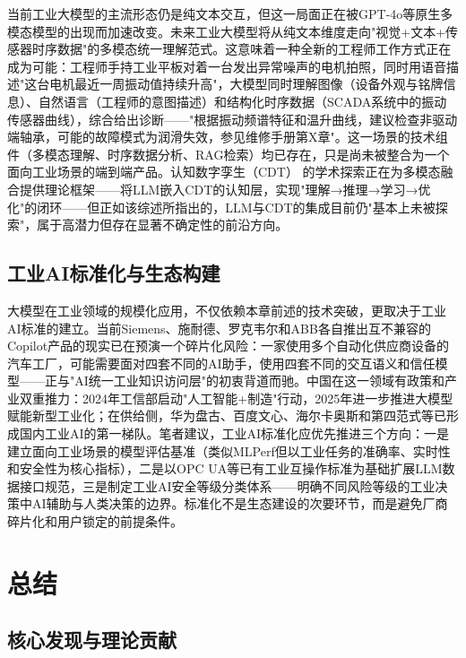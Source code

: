 \documentclass[12pt,a4paper]{ctexart}
\begin{document}
当前工业大模型的主流形态仍是纯文本交互，但这一局面正在被GPT-4o等原生多模态模型的出现而加速改变。\cite{ieee2024llmindustrial}未来工业大模型将从纯文本维度走向"视觉+文本+传感器时序数据"的多模态统一理解范式。这意味着一种全新的工程师工作方式正在成为可能：工程师手持工业平板对着一台发出异常噪声的电机拍照，同时用语音描述"这台电机最近一周振动值持续升高"，大模型同时理解图像（设备外观与铭牌信息）、自然语言（工程师的意图描述）和结构化时序数据（SCADA系统中的振动传感器曲线），综合给出诊断——"根据振动频谱特征和温升曲线，建议检查非驱动端轴承，可能的故障模式为润滑失效，参见维修手册第X章"。这一场景的技术组件（多模态理解、时序数据分析、RAG检索）均已存在，只是尚未被整合为一个面向工业场景的端到端产品。认知数字孪生（CDT）\cite{jiic2025cdtllm} 的学术探索正在为多模态融合提供理论框架——将LLM嵌入CDT的认知层，实现"理解→推理→学习→优化"的闭环——但正如该综述所指出的，LLM与CDT的集成目前仍"基本上未被探索"\cite{jiic2025cdtllm}，属于高潜力但存在显著不确定性的前沿方向。

\subsection{工业AI标准化与生态构建}

大模型在工业领域的规模化应用，不仅依赖本章前述的技术突破，更取决于工业AI标准的建立。当前Siemens、施耐德、罗克韦尔和ABB各自推出互不兼容的Copilot产品的现实已在预演一个碎片化风险：一家使用多个自动化供应商设备的汽车工厂，可能需要面对四套不同的AI助手，使用四套不同的交互语义和信任模型——正与"AI统一工业知识访问层"的初衷背道而驰。中国在这一领域有政策和产业双重推力：2024年工信部启动"人工智能+制造"行动，2025年进一步推进大模型赋能新型工业化；在供给侧，华为盘古、百度文心、海尔卡奥斯和第四范式等已形成国内工业AI的第一梯队\cite{hulian2025top10}。笔者建议，工业AI标准化应优先推进三个方向：一是建立面向工业场景的模型评估基准（类似MLPerf但以工业任务的准确率、实时性和安全性为核心指标），二是以OPC UA等已有工业互操作标准为基础扩展LLM数据接口规范，三是制定工业AI安全等级分类体系——明确不同风险等级的工业决策中AI辅助与人类决策的边界。标准化不是生态建设的次要环节，而是避免厂商碎片化和用户锁定的前提条件。

\section{总结}

\subsection{核心发现与理论贡献}
\end{document}
